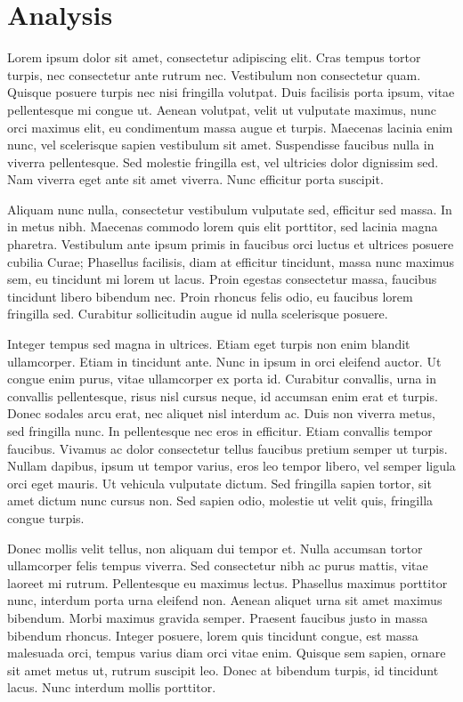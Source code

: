 \section{Analysis}
Lorem ipsum dolor sit amet, consectetur adipiscing elit. Cras tempus tortor turpis, nec consectetur ante rutrum nec. Vestibulum non consectetur quam. Quisque posuere turpis nec nisi fringilla volutpat. Duis facilisis porta ipsum, vitae pellentesque mi congue ut. Aenean volutpat, velit ut vulputate maximus, nunc orci maximus elit, eu condimentum massa augue et turpis. Maecenas lacinia enim nunc, vel scelerisque sapien vestibulum sit amet. Suspendisse faucibus nulla in viverra pellentesque. Sed molestie fringilla est, vel ultricies dolor dignissim sed. Nam viverra eget ante sit amet viverra. Nunc efficitur porta suscipit.

Aliquam nunc nulla, consectetur vestibulum vulputate sed, efficitur sed massa. In in metus nibh. Maecenas commodo lorem quis elit porttitor, sed lacinia magna pharetra. Vestibulum ante ipsum primis in faucibus orci luctus et ultrices posuere cubilia Curae; Phasellus facilisis, diam at efficitur tincidunt, massa nunc maximus sem, eu tincidunt mi lorem ut lacus. Proin egestas consectetur massa, faucibus tincidunt libero bibendum nec. Proin rhoncus felis odio, eu faucibus lorem fringilla sed. Curabitur sollicitudin augue id nulla scelerisque posuere.

Integer tempus sed magna in ultrices. Etiam eget turpis non enim blandit ullamcorper. Etiam in tincidunt ante. Nunc in ipsum in orci eleifend auctor. Ut congue enim purus, vitae ullamcorper ex porta id. Curabitur convallis, urna in convallis pellentesque, risus nisl cursus neque, id accumsan enim erat et turpis. Donec sodales arcu erat, nec aliquet nisl interdum ac. Duis non viverra metus, sed fringilla nunc. In pellentesque nec eros in efficitur. Etiam convallis tempor faucibus. Vivamus ac dolor consectetur tellus faucibus pretium semper ut turpis. Nullam dapibus, ipsum ut tempor varius, eros leo tempor libero, vel semper ligula orci eget mauris. Ut vehicula vulputate dictum. Sed fringilla sapien tortor, sit amet dictum nunc cursus non. Sed sapien odio, molestie ut velit quis, fringilla congue turpis.

Donec mollis velit tellus, non aliquam dui tempor et. Nulla accumsan tortor ullamcorper felis tempus viverra. Sed consectetur nibh ac purus mattis, vitae laoreet mi rutrum. Pellentesque eu maximus lectus. Phasellus maximus porttitor nunc, interdum porta urna eleifend non. Aenean aliquet urna sit amet maximus bibendum. Morbi maximus gravida semper. Praesent faucibus justo in massa bibendum rhoncus. Integer posuere, lorem quis tincidunt congue, est massa malesuada orci, tempus varius diam orci vitae enim. Quisque sem sapien, ornare sit amet metus ut, rutrum suscipit leo. Donec at bibendum turpis, id tincidunt lacus. Nunc interdum mollis porttitor.

